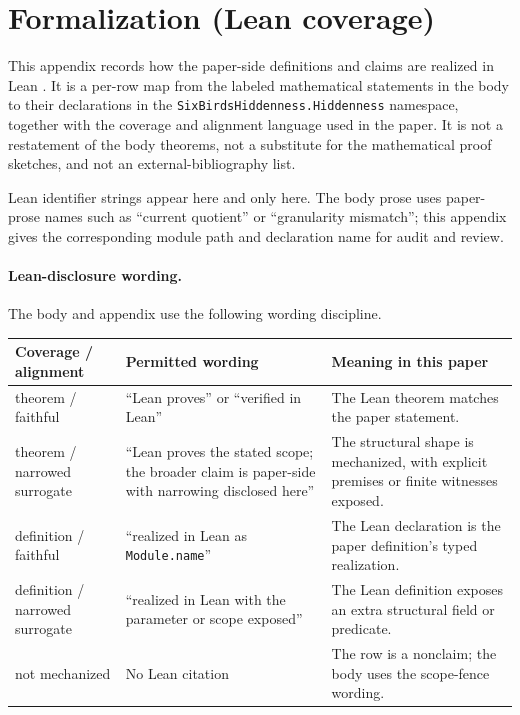 \documentclass[11pt]{article}
\theoremstyle{definition}
\begin{document}
\appendix


\section{Formalization (Lean coverage)}
\label{app:formalization}

This appendix records how the paper-side definitions and claims are
realized in Lean \citep{DeMouraUllrich2021Lean4}.  It is a per-row map
from the labeled mathematical statements in the body to their
declarations in the \texttt{SixBirdsHiddenness.Hiddenness} namespace,
together with the coverage and alignment language used in the paper.  It is not a
restatement of the body theorems, not a substitute for the mathematical
proof sketches, and not an external-bibliography list.

Lean identifier strings appear here and only here.  The body prose uses
paper-prose names such as ``current quotient'' or ``granularity
mismatch''; this appendix gives the corresponding module path and
declaration name for audit and review.

\paragraph{Lean-disclosure wording.}
The body and appendix use the following wording discipline.
\begin{center}
\small
\begin{tabularx}{\textwidth}{@{}>{\raggedright\arraybackslash}p{}>{\raggedright\arraybackslash}p{}>{\raggedright\arraybackslash}X@{}}
\toprule
Coverage / alignment & Permitted wording & Meaning in this paper \\
\midrule
theorem / faithful & ``Lean proves'' or ``verified in Lean'' & The Lean theorem matches the paper statement. \\
theorem / narrowed surrogate & ``Lean proves the stated scope; the broader claim is paper-side with narrowing disclosed here'' & The structural shape is mechanized, with explicit premises or finite witnesses exposed. \\
definition / faithful & ``realized in Lean as \texttt{Module.name}'' & The Lean declaration is the paper definition's typed realization. \\
definition / narrowed surrogate & ``realized in Lean with the parameter or scope exposed'' & The Lean definition exposes an extra structural field or predicate. \\
not mechanized & No Lean citation & The row is a nonclaim; the body uses the scope-fence wording. \\
\bottomrule
\end{tabularx}
\end{center}
\end{document}
